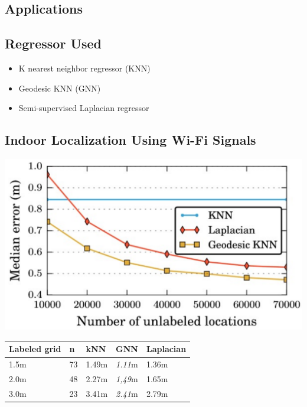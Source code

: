 \documentclass[a0,landscape]{a0poster}
\begin{document}
\begin{multicols}{4}
\color{SaddleBrown} %

\section*{Applications}


\subsection*{Regressor Used}
    \normalsize
    \begin{itemize}
        \item K nearest neighbor regressor (KNN)
        \item Geodesic KNN (GNN)
        \item Semi-supervised Laplacian regressor
    \end{itemize}
    
\subsection*{Indoor Localization Using Wi-Fi Signals}
    \normalsize
    \begin{center}
        \includegraphics[width=0.8\linewidth]{simulatedacccase1-converted.pdf}
    \end{center}
    
    \begin{center}
        \begin{tabular}{l l l l l}
        \toprule
        \textbf{Labeled grid} & \textbf{n} & \textbf{kNN} & \textbf{GNN} & \textbf{Laplacian}\\
        \midrule
        1.5m & 73 & 1.49m & \textit{1.11}m & 1.36m \\
        2.0m & 48 & 2.27m & \textit{1,49}m & 1.65m \\
        3.0m & 23 & 3.41m & \textit{2.41}m & 2.79m \\
        \bottomrule
        \end{tabular}
    \end{center}
    

\end{multicols}
\end{document}
